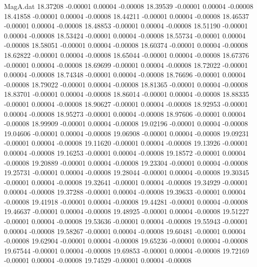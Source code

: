\begin{filecontents}{MagA.dat}
  18.37208   -0.00001    0.00004   -0.00008
  18.39539   -0.00001    0.00004   -0.00008
  18.41858   -0.00001    0.00004   -0.00008
  18.44211   -0.00001    0.00004   -0.00008
  18.46537   -0.00001    0.00004   -0.00008
  18.48853   -0.00001    0.00004   -0.00008
  18.51190   -0.00001    0.00004   -0.00008
  18.53424   -0.00001    0.00004   -0.00008
  18.55734   -0.00001    0.00004   -0.00008
  18.58051   -0.00001    0.00004   -0.00008
  18.60374   -0.00001    0.00004   -0.00008
  18.62822   -0.00001    0.00004   -0.00008
  18.65044   -0.00001    0.00004   -0.00008
  18.67376   -0.00001    0.00004   -0.00008
  18.69699   -0.00001    0.00004   -0.00008
  18.72022   -0.00001    0.00004   -0.00008
  18.74348   -0.00001    0.00004   -0.00008
  18.76696   -0.00001    0.00004   -0.00008
  18.79022   -0.00001    0.00004   -0.00008
  18.81365   -0.00001    0.00004   -0.00008
  18.83701   -0.00001    0.00004   -0.00008
  18.86014   -0.00001    0.00004   -0.00008
  18.88335   -0.00001    0.00004   -0.00008
  18.90627   -0.00001    0.00004   -0.00008
  18.92953   -0.00001    0.00004   -0.00008
  18.95273   -0.00001    0.00004   -0.00008
  18.97606   -0.00001    0.00004   -0.00008
  18.99909   -0.00001    0.00004   -0.00008
  19.02196   -0.00001    0.00004   -0.00008
  19.04606   -0.00001    0.00004   -0.00008
  19.06908   -0.00001    0.00004   -0.00008
  19.09231   -0.00001    0.00004   -0.00008
  19.11620   -0.00001    0.00004   -0.00008
  19.13926   -0.00001    0.00004   -0.00008
  19.16253   -0.00001    0.00004   -0.00008
  19.18572   -0.00001    0.00004   -0.00008
  19.20889   -0.00001    0.00004   -0.00008
  19.23304   -0.00001    0.00004   -0.00008
  19.25731   -0.00001    0.00004   -0.00008
  19.28044   -0.00001    0.00004   -0.00008
  19.30345   -0.00001    0.00004   -0.00008
  19.32641   -0.00001    0.00004   -0.00008
  19.34929   -0.00001    0.00004   -0.00008
  19.37288   -0.00001    0.00004   -0.00008
  19.39633   -0.00001    0.00004   -0.00008
  19.41918   -0.00001    0.00004   -0.00008
  19.44281   -0.00001    0.00004   -0.00008
  19.46637   -0.00001    0.00004   -0.00008
  19.48925   -0.00001    0.00004   -0.00008
  19.51227   -0.00001    0.00004   -0.00008
  19.53636   -0.00001    0.00004   -0.00008
  19.55943   -0.00001    0.00004   -0.00008
  19.58267   -0.00001    0.00004   -0.00008
  19.60481   -0.00001    0.00004   -0.00008
  19.62904   -0.00001    0.00004   -0.00008
  19.65236   -0.00001    0.00004   -0.00008
  19.67544   -0.00001    0.00004   -0.00008
  19.69853   -0.00001    0.00004   -0.00008
  19.72169   -0.00001    0.00004   -0.00008
  19.74529   -0.00001    0.00004   -0.00008

\end{filecontents}
